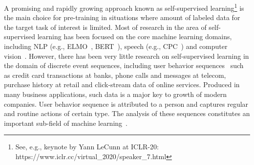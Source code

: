 \documentclass{article}
\begin{document}
A promising and rapidly growing approach known as self-supervised learning\footnote{See, e.g., keynote by Yann LeCunn at ICLR-20: https://www.iclr.cc/virtual\_2020/speaker\_7.html} is the main choice for pre-training in situations where amount of labeled data for the target task of interest is limited. %
Most of research in the area of self-supervised learning has been focused on the core machine learning domains, including NLP (e.g., ELMO~\citep{Peters2018DeepCW}, BERT~\citep{Devlin2019BERTPO}), speech (e.g., CPC~\citep{Oord2018RepresentationLW}) and computer vision~\citep{Doersch2015UnsupervisedVR, Oord2018RepresentationLW}.
However, there has been very little research on self-supervised learning in the domain of discrete event sequences, including  user behavior sequences~\citep{Ni2018PerceiveYU} such as credit card transactions at banks, phone calls and messages at telecom, purchase history at retail and click-stream data of online services. Produced in many business applications, such data is a major key to growth of modern companies. User behavior sequence is attributed to a person and captures regular and routine actions of certain type.
The analysis of these sequences constitutes an  important sub-field of machine learning~\citep{Laxman2008StreamPU, Wiese2009CreditCT, Zhang2017CreditRA, Bigon2019PredictionIV}.
\end{document}
